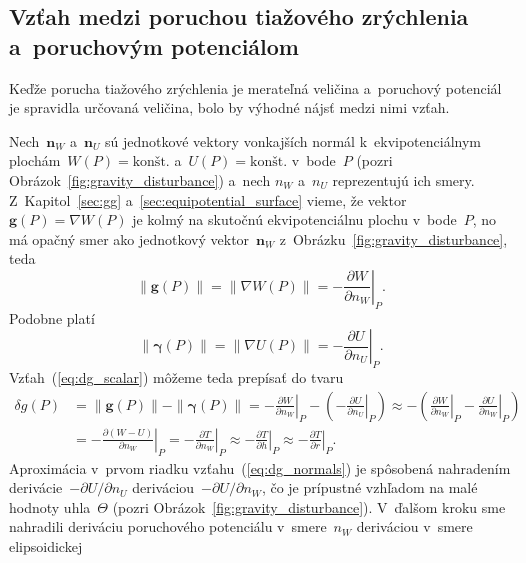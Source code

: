 \documentclass[a4paper,12pt]{book}
\let\vec\mathbf
\begin{document}
\subsection{Vzťah medzi poruchou tiažového zrýchlenia a~poruchovým potenciálom}

Keďže porucha tiažového zrýchlenia je merateľná veličina a~poruchový potenciál 
je spravidla určovaná veličina, bolo by výhodné nájsť medzi nimi vzťah.

Nech~$\vec n_W$ a~$\vec n_U$ sú jednotkové vektory vonkajších normál 
k~ekvipotenciálnym plochám~$W(P) = \textrm{konšt.}$ a~$U(P) = \textrm{konšt.}$ 
v~bode~$P$ (pozri Obrázok~\ref{fig:gravity_disturbance}) a~nech $n_W$ a~$n_U$ 
reprezentujú ich smery.  Z~Kapitol~\ref{sec:gg} 
a~\ref{sec:equipotential_surface} vieme, že vektor~$\vec g(P) = \nabla W(P)$ je 
kolmý na skutočnú ekvipotenciálnu plochu v~bode~$P$, no má opačný smer ako 
jednotkový vektor~$\vec n_W$ z~Obrázku~\ref{fig:gravity_disturbance}, teda
%
\begin{equation}
\| \vec g(P) \| = \| \nabla W(P) \| = -\left.\frac{\partial W}{\partial 
n_W}\right|_P.
\end{equation}
%
Podobne platí
%
\begin{equation}
\| \boldsymbol \gamma(P) \| = \| \nabla U(P) \| = -\left.\frac{\partial 
U}{\partial n_U}\right|_P.
\end{equation}
%
Vzťah~(\ref{eq:dg_scalar}) môžeme teda prepísať do tvaru
%
\begin{equation}
\label{eq:dg_normals}
\begin{split}
\delta g(P) &= \| \vec g(P) \| - \| \boldsymbol\gamma(P) \| 
= -\left.\frac{\partial W}{\partial n_W}\right|_P - \left( 
- \left.\frac{\partial U}{\partial n_U}\right|_P\right) \approx -\left( 
\left.\frac{\partial W}{\partial n_W}\right|_P - \left.\frac{\partial 
U}{\partial n_W}\right|_P\right)\\
%
&= -\left.\frac{\partial (W - U)}{\partial n_W}\right|_P 
=  -\left.\frac{\partial T}{\partial n_W}\right|_P \approx 
-\left.\frac{\partial T}{\partial h}\right|_P \approx -\left.\frac{\partial 
T}{\partial r}\right|_P{.}
\end{split}
\end{equation}
%
Aproximácia v~prvom riadku vzťahu~(\ref{eq:dg_normals}) je spôsobená nahradením 
derivácie~$-\partial U \slash \partial n_U$ deriváciou~$-\partial U \slash 
\partial n_W$, čo je prípustné vzhľadom na malé hodnoty uhla~$\Theta$ (pozri 
Obrázok~\ref{fig:gravity_disturbance}).  V~ďalšom kroku sme nahradili deriváciu 
poruchového potenciálu v~smere~$n_W$ deriváciou v~smere elipsoidickej 
\end{document}
